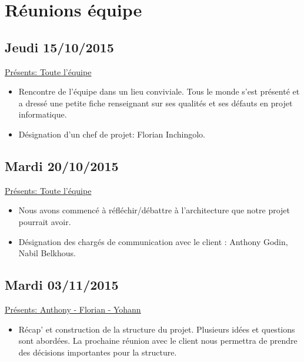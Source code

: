 \documentclass[a4paper,10pt]{article}
\begin{document}
\section{Réunions équipe}
\subsection{Jeudi 15/10/2015}
\underline{Présents: Toute l'équipe}
\\
\begin{itemize}
  \item Rencontre de l'équipe dans un lieu conviviale. Tous le monde s'est présenté et a dressé une petite fiche renseignant 
    sur ses qualités et ses défauts en projet informatique.
  \item Désignation d'un chef de projet: Florian Inchingolo. 
\end{itemize}

\subsection{Mardi 20/10/2015}
\underline{Présents: Toute l'équipe}
\\
\begin{itemize}
  \item Nous avons commencé à réfléchir/débattre à l'architecture que notre projet pourrait avoir. 
  \item Désignation des chargés de communication avec le client : Anthony Godin, Nabil Belkhous.
\end{itemize}
 
\subsection{Mardi 03/11/2015}
\underline{Présents: Anthony - Florian - Yohann}
\\
\begin{itemize}
  \item Récap' et construction de la structure du projet. Plusieurs idées et questions sont abordées. La prochaine réunion avec le client
	nous permettra de prendre des décisions importantes pour la structure.
\end{itemize}
\end{document}
